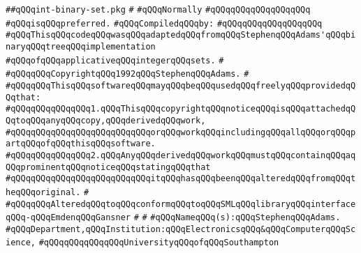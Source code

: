 \label{src/lib/src/int-binary-set.pkg}
\verb|##qQQqint-binary-set.pkg|\newline
\verb|#|\newline
\verb|#qQQqNormally|\newline
\verb|#qQQqqQQqqQQqqQQqqQQq|\newline
\verb|#qQQqisqQQqpreferred.|\newline
\newline
\verb|#qQQqCompiledqQQqby:|\newline
\verb|#qQQqqQQqqQQqqQQqqQQq|\newline
\newline
\verb|#qQQqThisqQQqcodeqQQqwasqQQqadaptedqQQqfromqQQqStephenqQQqAdams'qQQqbinaryqQQqtreeqQQqimplementation|\newline
\verb|#qQQqofqQQqapplicativeqQQqintegerqQQqsets.|\newline
\verb|#|\newline
\verb|#qQQqqQQqCopyrightqQQq1992qQQqStephenqQQqAdams.|\newline
\verb|#|\newline
\verb|#qQQqqQQqThisqQQqsoftwareqQQqmayqQQqbeqQQqusedqQQqfreelyqQQqprovidedqQQqthat:|\newline
\verb|#qQQqqQQqqQQqqQQq1.qQQqThisqQQqcopyrightqQQqnoticeqQQqisqQQqattachedqQQqtoqQQqanyqQQqcopy,qQQqderivedqQQqwork,|\newline
\verb|#qQQqqQQqqQQqqQQqqQQqqQQqqQQqorqQQqworkqQQqincludingqQQqallqQQqorqQQqpartqQQqofqQQqthisqQQqsoftware.|\newline
\verb|#qQQqqQQqqQQqqQQq2.qQQqAnyqQQqderivedqQQqworkqQQqmustqQQqcontainqQQqaqQQqprominentqQQqnoticeqQQqstatingqQQqthat|\newline
\verb|#qQQqqQQqqQQqqQQqqQQqqQQqqQQqitqQQqhasqQQqbeenqQQqalteredqQQqfromqQQqtheqQQqoriginal.|\newline
\verb|#|\newline
\verb|#qQQqqQQqAlteredqQQqtoqQQqconformqQQqtoqQQqSMLqQQqlibraryqQQqinterfaceqQQq-qQQqEmdenqQQqGansner|\newline
\verb|#|\newline
\verb|#|\newline
\verb|#qQQqNameqQQq(s):qQQqStephenqQQqAdams.|\newline
\verb|#qQQqDepartment,qQQqInstitution:qQQqElectronicsqQQq&qQQqComputerqQQqScience,|\newline
\verb|#qQQqqQQqqQQqqQQqUniversityqQQqofqQQqSouthampton|\newline
